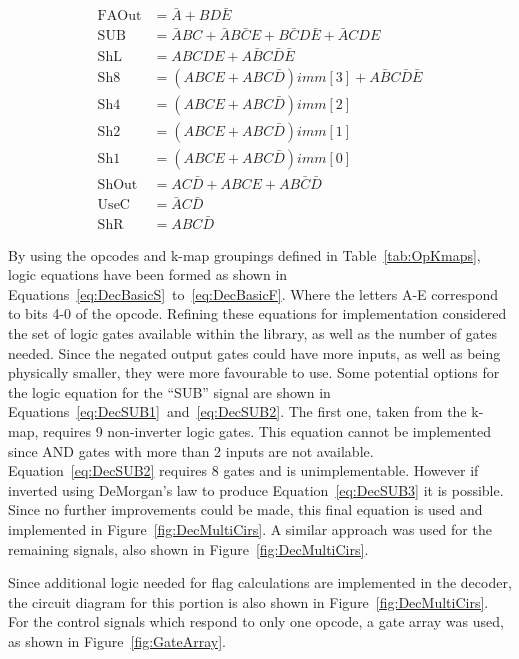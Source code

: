 \begin{align}
	\text{FAOut} &= \bar{A} + BD\bar{E} \label{eq:DecBasicS}\\
	\text{SUB} &= \bar{A}BC + \bar{A}B\bar{C}E + B\bar{C}D\bar{E} + \bar{A}CDE \\
	\text{ShL} &= ABCDE + A\bar{B}C\bar{D}\bar{E} \\
	\text{Sh8} &= (ABCE + ABC\bar{D})imm[3] + A\bar{B}C\bar{D}\bar{E} \\
	\text{Sh4} &= (ABCE + ABC\bar{D})imm[2] \\
	\text{Sh2} &= (ABCE + ABC\bar{D})imm[1] \\
	\text{Sh1} &= (ABCE + ABC\bar{D})imm[0] \\
	\text{ShOut} &= AC\bar{D} + ABCE + AB\bar{C}\bar{D} \\
	\text{UseC} &= \bar{A}C\bar{D} \\
	\text{ShR} &= ABC\bar{D} \label{eq:DecBasicF}
\end{align}

By using the opcodes and k-map groupings defined in Table~\ref{tab:OpKmaps}, logic equations have been formed as shown in Equations~\ref{eq:DecBasicS}~to~\ref{eq:DecBasicF}. 
Where the letters A-E correspond to bits 4-0 of the opcode. 
Refining these equations for implementation considered the set of logic gates available within the library, as well as the number of gates needed. 
Since the negated output gates could have more inputs, as well as being physically smaller, they were more favourable to use. 
Some potential options for the logic equation for the ``SUB'' signal are shown in Equations~\ref{eq:DecSUB1}~and~\ref{eq:DecSUB2}. 
The first one, taken from the k-map, requires 9 non-inverter logic gates. 
This equation cannot be implemented since AND gates with more than 2 inputs are not available. 
Equation~\ref{eq:DecSUB2} requires 8 gates and is unimplementable. 
However if inverted using DeMorgan's law to produce Equation~\ref{eq:DecSUB3} it is possible.
Since no further improvements could be made, this final equation is used and implemented in Figure~\ref{fig:DecMultiCirs}. A similar approach was used for the remaining signals, also shown in Figure~\ref{fig:DecMultiCirs}. 

Since additional logic needed for flag calculations are implemented in the decoder, the circuit diagram for this portion is also shown in Figure~\ref{fig:DecMultiCirs}. For the control signals which respond to only one opcode, a gate array was used, as shown in Figure~\ref{fig:GateArray}. 


